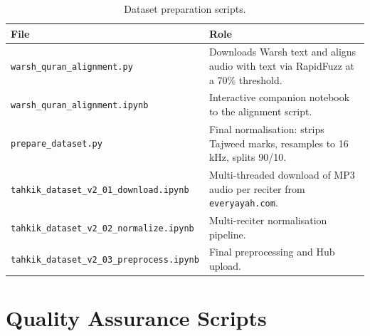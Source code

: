 \documentclass[12pt,a4paper]{report}
\begin{document}
\begin{table}[H]
  \centering
  \caption{Dataset preparation scripts.}
  \label{tab:mt_app_dataset}
  \renewcommand{\arraystretch}{1.3}
  \begin{tabular}{lp{8cm}}
    \toprule
    \textbf{File} & \textbf{Role} \\
    \midrule
    \texttt{warsh\_quran\_alignment.py}                & Downloads Warsh text and aligns audio with text via RapidFuzz at a 70\% threshold. \\
    \texttt{warsh\_quran\_alignment.ipynb}             & Interactive companion notebook to the alignment script. \\
    \texttt{prepare\_dataset.py}                       & Final normalisation: strips Tajweed marks, resamples to 16\,kHz, splits 90/10. \\
    \texttt{tahkik\_dataset\_v2\_01\_download.ipynb}   & Multi-threaded download of MP3 audio per reciter from \texttt{everyayah.com}. \\
    \texttt{tahkik\_dataset\_v2\_02\_normalize.ipynb}  & Multi-reciter normalisation pipeline. \\
    \texttt{tahkik\_dataset\_v2\_03\_preprocess.ipynb} & Final preprocessing and Hub upload. \\
    \bottomrule
  \end{tabular}
\end{table}

\section{Quality Assurance Scripts}
\end{document}
